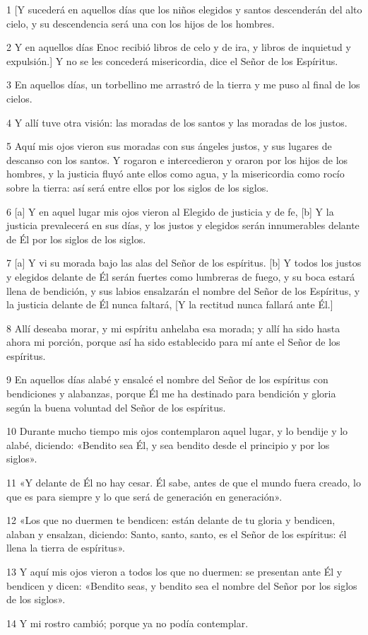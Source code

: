 \par 1 [Y sucederá en aquellos días que los niños elegidos y santos descenderán del alto cielo, y su descendencia será una con los hijos de los hombres.
\par 2 Y en aquellos días Enoc recibió libros de celo y de ira, y libros de inquietud y expulsión.] Y no se les concederá misericordia, dice el Señor de los Espíritus.
\par 3 En aquellos días, un torbellino me arrastró de la tierra y me puso al final de los cielos.
\par 4 Y allí tuve otra visión: las moradas de los santos y las moradas de los justos.
\par 5 Aquí mis ojos vieron sus moradas con sus ángeles justos, y sus lugares de descanso con los santos. Y rogaron e intercedieron y oraron por los hijos de los hombres, y la justicia fluyó ante ellos como agua, y la misericordia como rocío sobre la tierra: así será entre ellos por los siglos de los siglos.
\par 6 [a] Y en aquel lugar mis ojos vieron al Elegido de justicia y de fe, [b] Y la justicia prevalecerá en sus días, y los justos y elegidos serán innumerables delante de Él por los siglos de los siglos.
\par 7 [a] Y vi su morada bajo las alas del Señor de los espíritus. [b] Y todos los justos y elegidos delante de Él serán fuertes como lumbreras de fuego, y su boca estará llena de bendición, y sus labios ensalzarán el nombre del Señor de los Espíritus, y la justicia delante de Él nunca faltará, [Y la rectitud nunca fallará ante Él.]
\par 8 Allí deseaba morar, y mi espíritu anhelaba esa morada; y allí ha sido hasta ahora mi porción, porque así ha sido establecido para mí ante el Señor de los espíritus.
\par 9 En aquellos días alabé y ensalcé el nombre del Señor de los espíritus con bendiciones y alabanzas, porque Él me ha destinado para bendición y gloria según la buena voluntad del Señor de los espíritus.
\par 10 Durante mucho tiempo mis ojos contemplaron aquel lugar, y lo bendije y lo alabé, diciendo: «Bendito sea Él, y sea bendito desde el principio y por los siglos».
\par 11 «Y delante de Él no hay cesar. Él sabe, antes de que el mundo fuera creado, lo que es para siempre y lo que será de generación en generación».
\par 12 «Los que no duermen te bendicen: están delante de tu gloria y bendicen, alaban y ensalzan, diciendo: Santo, santo, santo, es el Señor de los espíritus: él llena la tierra de espíritus».
\par 13 Y aquí mis ojos vieron a todos los que no duermen: se presentan ante Él y bendicen y dicen: «Bendito seas, y bendito sea el nombre del Señor por los siglos de los siglos».
\par 14 Y mi rostro cambió; porque ya no podía contemplar.

